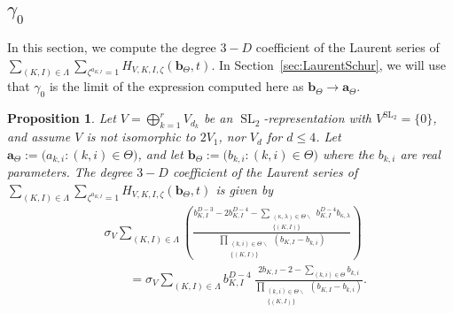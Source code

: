 \documentclass{amsart}
\newtheorem{proposition}[theorem]{Proposition}
\theoremstyle{definition}
\theoremstyle{remark}
\newcommand{\SL}{\operatorname{SL}}
\newcommand{\bs}{\boldsymbol}
\begin{document}

\subsection{$\gamma_0$}
\label{subsec:LaurentGamma0}


In this section, we compute the degree $3-D$ coefficient of the Laurent series of
$\sum_{(K,I)\in\Lambda} \sum_{\zeta^{a_{K,I}} = 1} H_{V,K,I,\zeta}(\bs{b}_\Theta,t)$.
In Section~\ref{sec:LaurentSchur}, we will use that $\gamma_0$ is the limit of
the expression computed here as $\bs{b}_\Theta\to\bs{a}_\Theta$.

\begin{proposition}
\label{prop:Gamma0First}
Let $V = \bigoplus_{k=1}^r V_{d_k}$ be an $\SL_2$-representation with $V^{\SL_2} = \{0\}$,
and assume $V$ is not isomorphic to $2V_1$, nor $V_d$ for $d \leq 4$.
Let $\bs{a}_\Theta := \big(a_{k,i} : (k,i)\in\Theta\big)$, and let
$\bs{b}_\Theta := \big(b_{k,i} : (k,i)\in\Theta\big)$ where the $b_{k,i}$ are
real parameters. The degree $3-D$ coefficient of the Laurent series of
$\sum_{(K,I)\in\Lambda} \sum_{\zeta^{a_{K,I}} = 1} H_{V,K,I,\zeta}(\bs{b}_\Theta,t)$
is given by
\begin{align}
\label{eq:Gamma0First}
    &\sigma_V \sum\limits_{(K,I) \in \Lambda} \left(
        \frac{b_{K,I}^{D-3} - 2 b_{K,I}^{D-4}
            - \sum\limits_{\substack{ (\kappa,\lambda)\in\Theta\smallsetminus \\ \{(K,I)\} }}
                b_{K,I}^{D-4} b_{\kappa,\lambda} }
        {\prod\limits_{\substack{(k,i)\in\Theta\smallsetminus \\ \{(K,I)\} }}
            (b_{K,I} - b_{k,i}) }
            \right)
    \\ \nonumber &\quad\quad =
    \sigma_V \sum\limits_{(K,I) \in \Lambda} b_{K,I}^{D-4}\
        \frac{2b_{K,I} - 2
        - \sum\limits_{(k,i)\in\Theta} b_{k,i}}
        {\prod\limits_{\substack{(k,i)\in\Theta\smallsetminus \\ \{(K,I)\} }}(b_{K,I} - b_{k,i})}.
\end{align}
\end{proposition}
\end{document}
